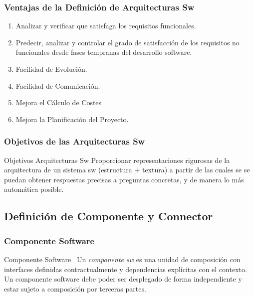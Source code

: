 ﻿\documentclass[handout,a4paper,slidestop,xcolor=pst,blue]{beamer}
\begin{document}
\begin{frame}[c]
	\frametitle{Ventajas de la Definición de Arquitecturas Sw}
	\begin{enumerate}[<+->]
		\item Analizar y verificar que satisfaga los requisitos funcionales.
		\item Predecir, analizar y controlar el grado de satisfacción de los requisitos no funcionales desde fases tempranas del desarrollo software.
		\item Facilidad de Evolución.
		\item Facilidad de Comunicación.
		\item Mejora el  Cálculo de Costes
		\item Mejora la Planificación del Proyecto.
	\end{enumerate}
\end{frame}

\begin{frame}[t]
	\frametitle{Objetivos de las Arquitecturas Sw}
	\begin{block}{Objetivos Arquitecturas Sw}
        Proporcionar representaciones rigurosas de la arquitectura de un sistema sw (estructura + textura) a partir de las cuales se se puedan obtener respuestas precisas a preguntas concretas, y de manera lo más automática posible.
	\end{block}
\end{frame}

\subsection{Definición de Componente y Connector}

\begin{frame}
	\frametitle{Componente Software}
	\begin{block}{Componente Software~\cite{szyperski:2011}}
		Un \emph{componente sw} es una unidad de composición con interfaces definidas contractualmente y dependencias explícitas con el contexto. Un componente software debe poder ser desplegado de forma independiente y estar sujeto a composición por terceras partes.
	\end{block}
\end{frame}
\end{document}
